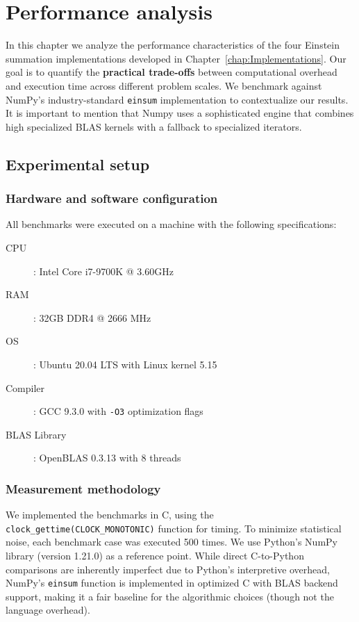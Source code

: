 \documentclass[binding=0.6cm]{sapthesis}
\begin{document}
\chapter{Performance analysis}

In this chapter we analyze the performance characteristics of the four Einstein summation implementations developed in Chapter~\ref{chap:Implementations}. Our goal is to quantify the \textbf{practical trade-offs} between computational overhead and execution time across different problem scales. We benchmark against NumPy's industry-standard \texttt{einsum} implementation to contextualize our results.
It is important to mention that Numpy uses a sophisticated engine that combines high specialized BLAS kernels with a fallback to specialized iterators.

\section{Experimental setup}

\subsection{Hardware and software configuration}

All benchmarks were executed on a machine with the following specifications:
\begin{description}
	\item [CPU]: Intel Core i7-9700K @ 3.60GHz
	\item [RAM]: 32GB DDR4 @ 2666 MHz
	\item [OS]: Ubuntu 20.04 LTS with Linux kernel 5.15
	\item [Compiler]: GCC 9.3.0 with \texttt{-O3} optimization flags
	\item [BLAS Library]: OpenBLAS 0.3.13 with 8 threads
\end{description}

\subsection{Measurement methodology}

We implemented the benchmarks in C, using the \texttt{clock\_gettime(CLOCK\_MONOTONIC)} function for timing. To minimize statistical noise, each benchmark case was executed 500 times.
We use Python's NumPy library (version 1.21.0) as a reference point. While direct C-to-Python comparisons are inherently imperfect due to Python's interpretive overhead, NumPy's \texttt{einsum} function is implemented in optimized C with BLAS backend support, making it a fair baseline for the algorithmic choices (though not the language overhead).
\end{document}
